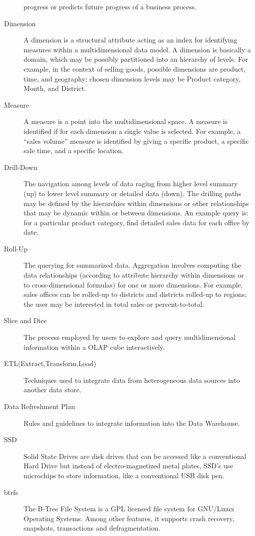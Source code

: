 \begin{description}
progress or predicts future progress of a business process.
\item[Dimension] A dimension is a structural attribute acting as an index for
identifying measures within a multidimensional data model. 
A dimension is basically a domain, which may be possibly partitioned into an 
hierarchy of levels. For example, in the context of selling goods, possible 
dimensions are product, time, and geography; chosen dimension levels may be 
Product category, Month, and District.
\item[Measure] A measure is a point into the multidimensional space. A measure
is identified if for each dimension a single value is selected. For example, 
a “sales volume” measure is identified by giving a specific product, 
a specific sale time, and a specific location.
\item[Drill-Down] The navigation among levels of data raging from higher level
summary (up) to lower level summary or detailed data (down). The drilling paths 
may be defined by the hierarchies within dimensions or other relationships that 
may be dynamic within or between dimensions. An example query is: for a 
particular product category, find detailed sales data for each office by date.
\item[Roll-Up] The querying for summarized data. Aggregation involves
computing the data relationships (according to attribute hierarchy within 
dimensions or to cross-dimensional formulas) for one or more dimensions. 
For example, sales offices can be rolled-up to districts and districts 
rolled-up to regions; the user may be interested in total sales or 
percent-to-total.
\item[Slice and Dice] The process employed by users to explore and query
multidimensional information within a OLAP cube interactively.
\item[ETL(Extract,Transform,Load)] Techniques used to integrate data from
heterogeneous data sources into another data store.
\item[Data Refreshment Plan] Rules and guidelines to integrate information
into the Data Warehouse.
\item[SSD] Solid State Drives are disk drives that can be accessed like a
conventional Hard Drive but instead of electro-magnetized metal plates, SSD’s 
use microchips to store information, like a conventional USB disk pen.
\item[btrfs] The B-Tree File System is a GPL licensed file system for GNU/Linux
Operating Systems. Among other features, it supports crash recovery, snapshots,
transactions and defragmentation.
\end{description}